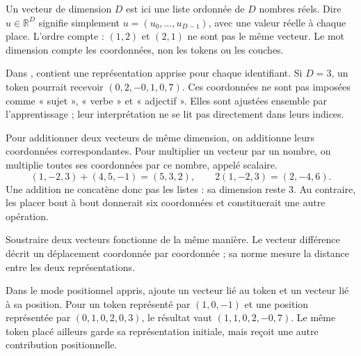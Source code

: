 

Un vecteur de dimension \(D\) est ici une liste ordonnée de \(D\)
nombres réels. Dire \(u\in\mathbb{R}^{D}\) signifie simplement
\(u=(u_0,\ldots,u_{D-1})\), avec une valeur réelle à chaque place.
L'ordre compte : \((1,2)\) et \((2,1)\) ne sont pas le même vecteur.
Le mot dimension compte les coordonnées, non les tokens ou les couches.

Dans ,  contient une représentation
apprise pour chaque identifiant. Si \(D=3\), un token pourrait recevoir
\((0{,}2,-0{,}1,0{,}7)\). Ces coordonnées ne sont pas imposées comme
« sujet », « verbe » et « adjectif ». Elles sont ajustées ensemble
par l'apprentissage ; leur interprétation ne se lit pas directement
dans leurs indices.

Pour additionner deux vecteurs de même dimension, on additionne leurs
coordonnées correspondantes. Pour multiplier un vecteur par un nombre,
on multiplie toutes ses coordonnées par ce nombre, appelé scalaire.
\[
 (1,-2,3)+(4,5,-1)=(5,3,2),
 \qquad 2(1,-2,3)=(2,-4,6).
\]
Une addition ne concatène donc pas les listes : sa dimension reste 3.
Au contraire, les placer bout à bout donnerait six coordonnées et
constituerait une autre opération.

Soustraire deux vecteurs fonctionne de la même manière.
Le vecteur différence décrit un déplacement coordonnée par coordonnée ;
sa norme mesure la distance entre les deux représentations.

Dans le mode positionnel appris,  ajoute
un vecteur lié au token et un vecteur lié à sa position.
Pour un token représenté par \((1,0,-1)\) et une position représentée
par \((0{,}1,0{,}2,0{,}3)\), le résultat vaut
\((1{,}1,0{,}2,-0{,}7)\). Le même token placé ailleurs garde sa
représentation initiale, mais reçoit une autre contribution positionnelle.


